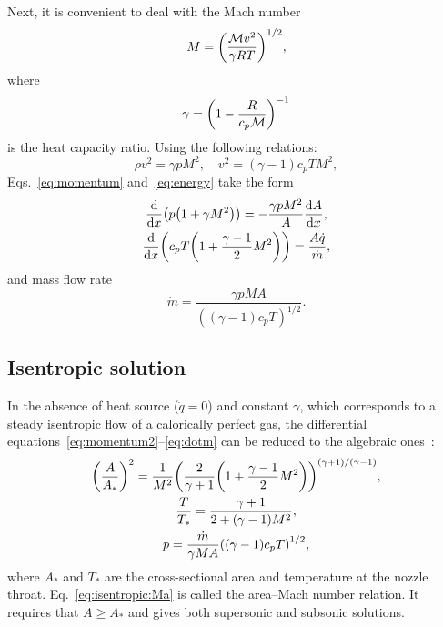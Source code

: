 \documentclass{article}
\begin{document}
Next, it is convenient to deal with the Mach number
\begin{equation}\label{eq:Mach}
    M = \qty(\frac{\mathcal{M}v^2}{\gamma RT})^{1/2},
\end{equation}
where
\begin{equation}\label{eq:gamma}
    \gamma = \qty(1-\frac{R}{c_p\mathcal{M}})^{-1}
\end{equation}
is the heat capacity ratio.
Using the following relations:
\begin{equation*}
    \rho v^2 = \gamma p M^2, \quad v^2 = (\gamma-1)c_pT M^2,
\end{equation*}
Eqs.~\eqref{eq:momentum} and~\eqref{eq:energy} take the form
\begin{gather}
    \dv{x}(p\qty(1 + \gamma M^2)) = -\frac{\gamma p M^2}{A}\dv{A}{x}, \label{eq:momentum2}\\
    \dv{x}(c_pT\qty(1 + \frac{\gamma-1}{2}M^2)) = \frac{A\dot{q}}{\dot{m}}, \label{eq:energy2}
\end{gather}
and mass flow rate
\begin{equation}\label{eq:dotm}
    \dot{m} = \frac{\gamma pMA}{((\gamma-1)c_pT)^{1/2}}.
\end{equation}

\subsection{Isentropic solution}

In the absence of heat source ($\dot{q}=0$) and constant $\gamma$,
which corresponds to a steady isentropic flow of a calorically perfect gas,
the differential equations~\eqref{eq:momentum2}--\eqref{eq:dotm}
can be reduced to the algebraic ones~\cite[Sec.~5.4]{anderson1990modern}:
\begin{gather}
    \qty(\frac{A}{A_*})^2 = \frac1{M^2}
        \qty(\frac{2}{\gamma+1}\qty(1+\frac{\gamma-1}{2}M^2))^{(\gamma+1)/(\gamma-1)}, \label{eq:isentropic:Ma}\\
    \frac{T}{T_*} = \frac{\gamma+1}{2 + (\gamma-1)M^2}, \label{eq:isentropic:T}\\
    p = \frac{\dot{m}}{\gamma MA}\qty((\gamma-1)c_pT)^{1/2}, \label{eq:isentropic:P}
\end{gather}
where $A_*$ and $T_*$ are the cross-sectional area and temperature at the nozzle throat.
Eq.~\eqref{eq:isentropic:Ma} is called the area--Mach number relation.
It requires that $A\geq A_*$ and gives both supersonic and subsonic solutions.
\end{document}
